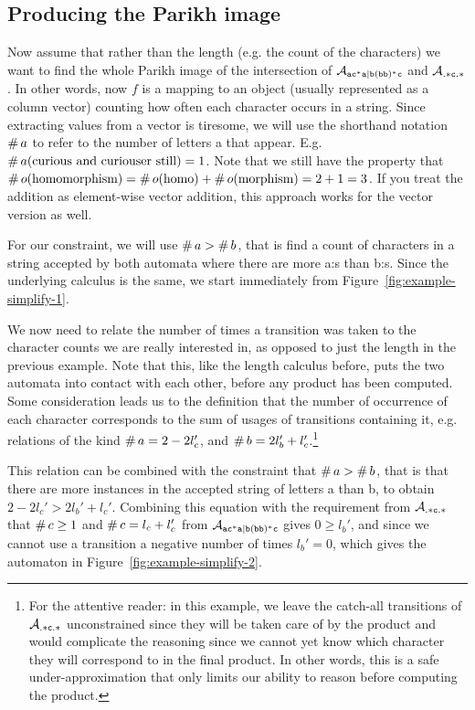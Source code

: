 \documentclass[acmsmall,review,anonymous,screen]{acmart}\settopmatter{printfolios=true,printccs=false,printacmref=true}
\theoremstyle{definition}
\begin{document}
\subsection{Producing the Parikh image}\label{sec:introduction:parikh}

Now assume that rather than the length (e.g. the count of the characters) we
want to find the whole Parikh image of the intersection of $\mathcal{A}_{\mathtt{ac^*a|b(bb)^*c}}{}$ and
$\mathcal{A}_{\mathtt{.*c.*}}{}$. In other words, now $f$ is a mapping to an object
(usually represented as a column vector) counting how often each character
occurs in a string. Since extracting values from a vector is tiresome, we will
use the shorthand notation $\operatorname{\#}{a}$ to refer to the number of
letters a that appear. E.g. $\operatorname{\#}{a}(\text{curious and curiouser
still}) = 1$. Note that we still have the property that
$\operatorname{\#}{o}(\text{homomorphism}) = \operatorname{\#}{o}(\text{homo}) +
\operatorname{\#}{o}(\text{morphism}) = 2 + 1 = 3$. If you treat the addition as
element-wise vector addition, this approach works for the vector version as
well.

For our constraint, we will use $\operatorname{\#}{a} > \operatorname{\#}{b}$,
that is find a count of characters in a string accepted by both automata where
there are more a:s than b:s. Since the underlying calculus is the same, we start immediately from Figure~\ref{fig:example-simplify-1}.

  We now need to relate the number of times a transition was taken to the
  character counts we are really interested in, as opposed to just the length in
  the previous example. Note that this, like the length calculus before, puts
  the two automata into contact with each other, before any product has been
  computed. Some consideration leads us to the definition that the number of
  occurrence of each character corresponds to the sum of usages of transitions
  containing it, e.g. relations of the kind $\operatorname{\#}{a} = 2 - 2l_c'$,
  and $\operatorname{\#}{b} = 2 l_b' + l_c'$.\footnote{For the attentive reader:
  in this example, we leave the catch-all transitions of $\mathcal{A}_{\mathtt{.*c.*}}$
  unconstrained since they will be taken care of by the product and would
  complicate the reasoning since we cannot yet know which character they will
  correspond to in the final product. In other words, this is a safe
  under-approximation that only limits our ability to reason before computing
  the product.}

This relation can be combined with the constraint that $\operatorname{\#}{a} >
\operatorname{\#}{b}$, that is that there are more instances in the accepted
string of letters a than b, to obtain $2 - 2l_c' > 2 l_b' + l_c'$. Combining this
equation with the requirement from $\mathcal{A}_{\mathtt{.*c.*}}$ that
$\operatorname{\#}{c} \geq 1$ and $\operatorname{\#}{c} = l_c + l_c'$ from
$\mathcal{A}_{\mathtt{ac^*a|b(bb)^*c}}$ gives $0 \geq l_b'$, and since we cannot use a transition a negative
number of times $l_b' = 0$, which gives the automaton in
Figure~\ref{fig:example-simplify-2}.
\end{document}
